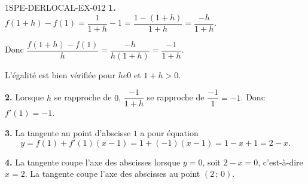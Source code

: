 \begin{corrige}{1SPE-DERLOCAL-EX-012}
\textbf{1.} $f(1+h)-f(1)=\dfrac{1}{1+h}-1=\dfrac{1-(1+h)}{1+h}=\dfrac{-h}{1+h}$.

Donc $\dfrac{f(1+h)-f(1)}{h}=\dfrac{-h}{h(1+h)}=\dfrac{-1}{1+h}$.

L'égalité est bien vérifiée pour $h
e 0$ et $1+h>0$.

\textbf{2.} Lorsque $h$ se rapproche de $0$, $\dfrac{-1}{1+h}$ se rapproche de $\dfrac{-1}{1}=-1$. Donc $f'(1)=-1$.

\textbf{3.} La tangente au point d'abscisse $1$ a pour équation
\[
y=f(1)+f'(1)(x-1)=1+(-1)(x-1)=1-x+1=2-x.
\]

\textbf{4.} La tangente coupe l'axe des abscisses lorsque $y=0$, soit $2-x=0$, c'est-à-dire $x=2$. La tangente coupe l'axe des abscisses au point $(2\,;\,0)$.
\end{corrige}
